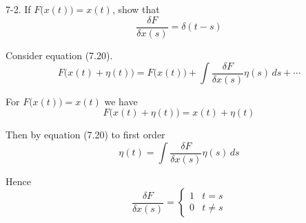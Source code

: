 \documentclass[12pt]{article}
\begin{document}
7-2.
If $F\big(x(t)\big)=x(t)$, show that
\begin{equation*}
\frac{\delta F}{\delta x(s)}=\delta(t-s)
\end{equation*}

Consider equation (7.20).
\begin{equation*}
F\big(x(t)+\eta(t)\big)=F\big(x(t)\big)+\int\frac{\delta F}{\delta x(s)}\eta(s)\,ds+\cdots
\tag{7.20}
\end{equation*}

For $F\big(x(t)\big)=x(t)$ we have
\begin{equation*}
F\big(x(t)+\eta(t)\big)=x(t)+\eta(t)
\end{equation*}

Then by equation (7.20) to first order
\begin{equation*}
\eta(t)=\int\frac{\delta F}{\delta x(s)}\eta(s)\,ds
\end{equation*}

Hence
\begin{equation*}
\frac{\delta F}{\delta x(s)}=
\begin{cases}
1 & t=s
\\
0 & t\ne s
\end{cases}
\end{equation*}
\end{document}
